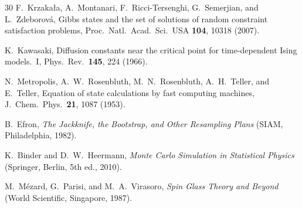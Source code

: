 \documentclass[aps, pre, reprint, amsmath, amssymb, superscriptaddress, floatfix]{revtex4-2}
\begin{document}
\begin{thebibliography}{30}
F.~Krzaka{\l}a, A.~Montanari, F.~Ricci-Tersenghi,
G.~Semerjian, and L.~Zdeborov\'a,
Gibbs states and the set of solutions of random constraint
satisfaction problems,
Proc.\ Natl.\ Acad.\ Sci.\ USA \textbf{104}, 10318 (2007).

K.~Kawasaki,
Diffusion constants near the critical point for time-dependent Ising
models.\ I,
Phys.\ Rev.\ \textbf{145}, 224 (1966).

N.~Metropolis, A.~W.~Rosenbluth, M.~N.~Rosenbluth, A.~H.~Teller,
and E.~Teller,
Equation of state calculations by fast computing machines,
J.~Chem.~Phys.\ \textbf{21}, 1087 (1953).

B.~Efron,
\textit{The Jackknife, the Bootstrap, and Other Resampling Plans}
(SIAM, Philadelphia, 1982).

K.~Binder and D.~W.~Heermann,
\textit{Monte Carlo Simulation in Statistical Physics}
(Springer, Berlin, 5th ed., 2010).

M.~M\'ezard, G.~Parisi, and M.~A.~Virasoro,
\textit{Spin Glass Theory and Beyond}
(World Scientific, Singapore, 1987).

\end{thebibliography}
\end{document}
